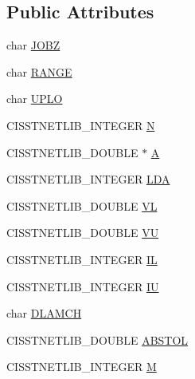 \subsection*{Public Attributes}
\begin{DoxyCompactItemize}
\item 
char \hyperlink{classnmr_symmetric_eigen_problem_1_1_data_a877568a0a03b5a49914b15dafb3154f7}{J\-O\-B\-Z}
\item 
char \hyperlink{classnmr_symmetric_eigen_problem_1_1_data_ab28fe48793808aa0dcfc0c4637a7696f}{R\-A\-N\-G\-E}
\item 
char \hyperlink{classnmr_symmetric_eigen_problem_1_1_data_abde7a48eda7afb8fc30994433a7c995f}{U\-P\-L\-O}
\item 
C\-I\-S\-S\-T\-N\-E\-T\-L\-I\-B\-\_\-\-I\-N\-T\-E\-G\-E\-R \hyperlink{classnmr_symmetric_eigen_problem_1_1_data_a94f546df5490f6bac466922f299fb4fc}{N}
\item 
C\-I\-S\-S\-T\-N\-E\-T\-L\-I\-B\-\_\-\-D\-O\-U\-B\-L\-E $\ast$ \hyperlink{classnmr_symmetric_eigen_problem_1_1_data_aa45f414eef4fb85b15868757aa728448}{A}
\item 
C\-I\-S\-S\-T\-N\-E\-T\-L\-I\-B\-\_\-\-I\-N\-T\-E\-G\-E\-R \hyperlink{classnmr_symmetric_eigen_problem_1_1_data_af258788e3a2b697a671b1bc0f69837bc}{L\-D\-A}
\item 
C\-I\-S\-S\-T\-N\-E\-T\-L\-I\-B\-\_\-\-D\-O\-U\-B\-L\-E \hyperlink{classnmr_symmetric_eigen_problem_1_1_data_a22ea6bd44fed0d8aadac2798d3cdac8e}{V\-L}
\item 
C\-I\-S\-S\-T\-N\-E\-T\-L\-I\-B\-\_\-\-D\-O\-U\-B\-L\-E \hyperlink{classnmr_symmetric_eigen_problem_1_1_data_a72746a653e1db7e9191066101d84cf1e}{V\-U}
\item 
C\-I\-S\-S\-T\-N\-E\-T\-L\-I\-B\-\_\-\-I\-N\-T\-E\-G\-E\-R \hyperlink{classnmr_symmetric_eigen_problem_1_1_data_a67105932298cfc5cf99d0a4fc6839505}{I\-L}
\item 
C\-I\-S\-S\-T\-N\-E\-T\-L\-I\-B\-\_\-\-I\-N\-T\-E\-G\-E\-R \hyperlink{classnmr_symmetric_eigen_problem_1_1_data_a9940018252e49996dd24975e2e6bcddc}{I\-U}
\item 
char \hyperlink{classnmr_symmetric_eigen_problem_1_1_data_a0d4cc9287cdb029e975938ed4c153d65}{D\-L\-A\-M\-C\-H}
\item 
C\-I\-S\-S\-T\-N\-E\-T\-L\-I\-B\-\_\-\-D\-O\-U\-B\-L\-E \hyperlink{classnmr_symmetric_eigen_problem_1_1_data_af5347eda97d1b64505380937953d1d97}{A\-B\-S\-T\-O\-L}
\item 
C\-I\-S\-S\-T\-N\-E\-T\-L\-I\-B\-\_\-\-I\-N\-T\-E\-G\-E\-R \hyperlink{classnmr_symmetric_eigen_problem_1_1_data_a6a36a42cbcee5c64d9f407ad7813f8d6}{M}

\end{DoxyCompactItemize}
